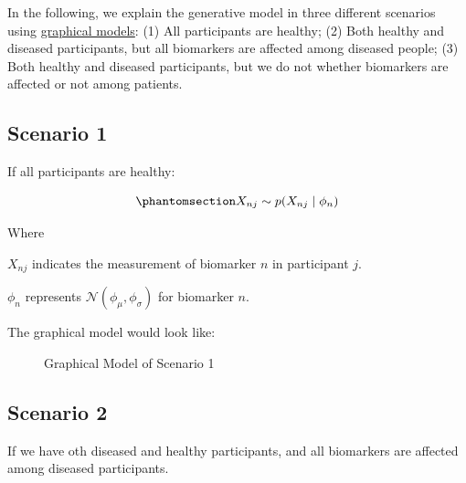\documentclass[
  letterpaper,
  DIV=11,
  numbers=noendperiod]{scrreprt}
\begin{document}
In the following, we explain the generative model in three different
scenarios using
\href{https://en.wikipedia.org/wiki/Graphical_model}{graphical models}:
(1) All participants are healthy; (2) Both healthy and diseased
participants, but all biomarkers are affected among diseased people; (3)
Both healthy and diseased participants, but we do not whether biomarkers
are affected or not among patients.

\subsection{Scenario 1}\label{scenario-1}

If all participants are healthy:

\begin{equation}\phantomsection\label{eq-gen-s1}{
X_{nj} \sim p(X_{nj} \mid \phi_{n})
}\end{equation}

Where

\(X_{nj}\) indicates the measurement of biomarker \(n\) in participant
\(j\).

\(\phi_{n}\) represents \(\mathcal N(\phi_{\mu}, \phi_{\sigma})\) for
biomarker \(n\).

The graphical model would look like:

\begin{figure}


\caption{\label{fig-g1}Graphical Model of Scenario 1}

\end{figure}%

\subsection{Scenario 2}\label{scenario-2}

If we have oth diseased and healthy participants, and all biomarkers are
affected among diseased participants.
\end{document}
